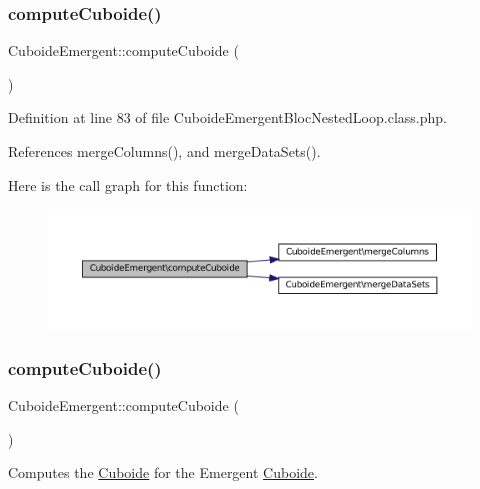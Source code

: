 \subsubsection{\texorpdfstring{compute\+Cuboide()}{computeCuboide()}\hspace{0.1cm}{\footnotesize\ttfamily [1/2]}}
{\footnotesize\ttfamily Cuboide\+Emergent\+::compute\+Cuboide (\begin{DoxyParamCaption}{ }\end{DoxyParamCaption})}



Definition at line 83 of file Cuboide\+Emergent\+Bloc\+Nested\+Loop.\+class.\+php.



References merge\+Columns(), and merge\+Data\+Sets().

Here is the call graph for this function\+:\nopagebreak
\begin{figure}[H]
\begin{center}
\leavevmode
\includegraphics[width=350pt]{class_cuboide_emergent_affd999bbc9889ce2746e485aea1973e3_cgraph}
\end{center}
\end{figure}
\mbox{\label{class_cuboide_emergent_affd999bbc9889ce2746e485aea1973e3}} 
\subsubsection{\texorpdfstring{compute\+Cuboide()}{computeCuboide()}\hspace{0.1cm}{\footnotesize\ttfamily [2/2]}}
{\footnotesize\ttfamily Cuboide\+Emergent\+::compute\+Cuboide (\begin{DoxyParamCaption}{ }\end{DoxyParamCaption})}

Computes the \hyperlink{class_cuboide}{Cuboide} for the Emergent \hyperlink{class_cuboide}{Cuboide}. 


